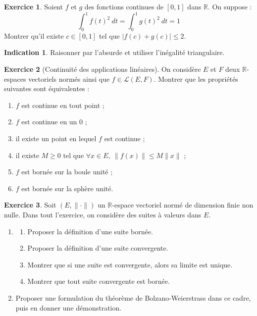 \documentclass[french]{book}
\newcommand{\R}{\mathbb{R}}
\theoremstyle{definition}
\newtheorem{ex}{Exercice}[chapter]
\theoremstyle{theorem}
\newtheorem*{ind}{Indication}
\theoremstyle{remark}
\begin{document}
\begin{ex}
	Soient $f$ et $g$ des fonctions continues de $[0,1]$ dans $\R$. On suppose : $$\int_{0}^{1}f(t)^2\ dt=\int_{0}^{1}g(t)^2\ dt=1$$ Montrer qu'il existe $c\in[0,1]$ tel que $\lvert f(c)+g(c)\rvert\leqslant 2$.
\end{ex}

\begin{ind}
	Raisonner par l'absurde et utiliser l'inégalité triangulaire.
\end{ind}

\begin{ex}[Continuité des applications linéaires]
	On considère $E$ et $F$ deux $\R$-espaces vectoriels normés ainsi que $f\in\mathcal{L}(E,F)$. Montrer que les propriétés suivantes sont équivalentes : 
	\begin{enumerate}
		\item $f$ est continue en tout point ;
		\item $f$ est continue en un $0$ ;
		\item il existe un point en lequel $f$ est continue ;
		\item il existe $M\geqslant 0$ tel que $\forall x\in E,\ \lVert f(x)\rVert\leqslant M\lVert x\rVert$ ;
		\item $f$ est bornée sur la boule unité ;
		\item $f$ est bornée sur la sphère unité.
	\end{enumerate}
\end{ex}

\begin{ex}
	Soit $(E,\lVert\cdot\rVert)$ un $\R$-espace vectoriel normé de dimension finie non nulle. Dans tout l'exercice, on considère des suites à valeurs dans $E$.
	\begin{enumerate}
		\item \begin{enumerate}[label=\alph*.]
			\item Proposer la définition d'une suite bornée.
			\item Proposer la définition d'une suite convergente.
			\item Montrer que si une suite est convergente, alors sa limite est unique.
			\item Montrer que tout suite convergente est bornée.
		\end{enumerate}
		\item Proposer une formulation du théorème de Bolzano-Weierstrass dans ce cadre, puis en donner une démonstration.
	\end{enumerate}
\end{ex}
\end{document}
